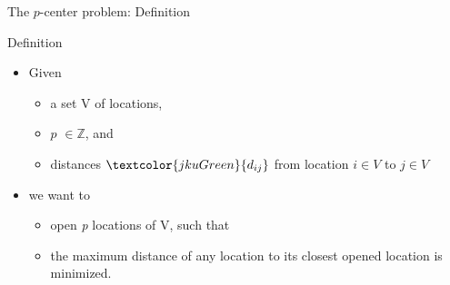 \documentclass[utf8,aspectratio=169,ngerman,english]{beamer}
\renewcommand{\emph}[1]{\textcolor{jkuGreen}{#1}}
\newcommand{\pCP}{$p$CP\xspace}
\newcommand{\npCP}{n-$p$CP\xspace}
\begin{document}
\begin{frame}{The $p$-center problem: Definition}
    \begin{block}{Definition}
        \begin{itemize}
            \item Given \pause
                  \begin{itemize}
                      \item a set V of locations, \pause
                      \item \emph{$p$} $\in \mathbb{Z}$, and \pause
                      \item \emph{distances} $\emph{d_{ij}}$ from location $i \in V$ to $j \in V$ \pause
                  \end{itemize}
            \item we want to
                  \begin{itemize}
                      \item \emph{open \textit{p} locations} of V, such that \pause
                      \item the \emph{maximum distance} of any location to its closest opened location is \emph{minimized}.
                  \end{itemize}
        \end{itemize}
    \end{block}
\end{frame}
\end{document}
